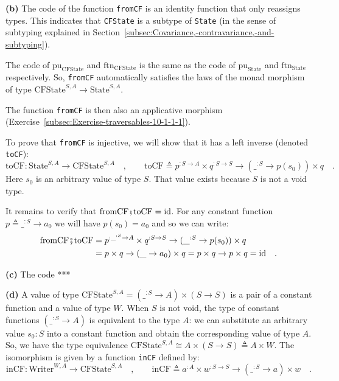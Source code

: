 \textbf{(b)} The code of the function \lstinline!fromCF! is an identity
function that only reassigns types. This indicates that \lstinline!CFState!
is a subtype of \lstinline!State! (in the sense of subtyping explained
in Section~\ref{subsec:Covariance,-contravariance,-and-subtyping}).

The code of $\text{pu}_{\text{CFState}}$ and $\text{ftn}_{\text{CFState}}$
is the same as the code of $\text{pu}_{\text{State}}$ and $\text{ftn}_{\text{State}}$
respectively. So, \lstinline!fromCF! automatically satisfies the
laws of the monad morphism of type $\text{CFState}^{S,A}\rightarrow\text{State}^{S,A}$. 

The function \lstinline!fromCF! is then also an applicative morphism
(Exercise~\ref{subsec:Exercise-traversables-10-1-1-1}).

To prove that \lstinline!fromCF! is injective, we will show that
it has a left inverse (denoted \lstinline!toCF!):
\[
\text{toCF}:\text{State}^{S,A}\rightarrow\text{CFState}^{S,A}\quad,\quad\quad\text{toCF}\triangleq p^{:S\rightarrow A}\times q^{:S\rightarrow S}\rightarrow(\_^{:S}\rightarrow p(s_{0}))\times q\quad.
\]
Here $s_{0}$ is an arbitrary value of type $S$. That value exists
because $S$ is not a void type.

It remains to verify that $\text{fromCF}\bef\text{toCF}=\text{id}$.
For any constant function $p\triangleq\_^{:S}\rightarrow a_{0}$ we
will have $p(s_{0})=a_{0}$ and so we can write:
\begin{align*}
\text{fromCF}\bef\text{toCF} & =p^{:\_^{:S}\rightarrow A}\times q^{:S\rightarrow S}\rightarrow(\_^{:S}\rightarrow p(s_{0}))\times q\\
 & =p\times q\rightarrow(\_\rightarrow a_{0})\times q=p\times q\rightarrow p\times q=\text{id}\quad.
\end{align*}

\textbf{(c)} The code {*}{*}{*}

\textbf{(d)} A value of type $\text{CFState}^{S,A}=(\_^{:S}\rightarrow A)\times(S\rightarrow S)$
is a pair of a constant function and a value of type $W$. When $S$
is not void, the type of constant functions $(\_^{:S}\rightarrow A)$
is equivalent to the type $A$: we can substitute an arbitrary value
$s_{0}:S$ into a constant function and obtain the corresponding value
of type $A$. So, we have the type equivalence $\text{CFState}^{S,A}\cong A\times(S\rightarrow S)\triangleq A\times W$.
The isomorphism is given by a function \lstinline!inCF! defined by:
\[
\text{inCF}:\text{Writer}^{W,A}\rightarrow\text{CFState}^{S,A}\quad,\quad\quad\text{inCF}\triangleq a^{:A}\times w^{:S\rightarrow S}\rightarrow(\_^{:S}\rightarrow a)\times w\quad.
\]

